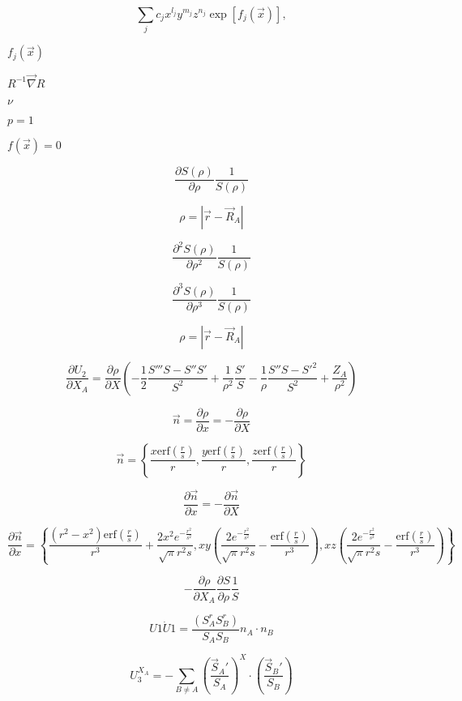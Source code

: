 \documentclass{article}
\begin{document}
\[
\sum_j c_j x^{l_j} y^{m_j} z^{n_j} \exp[f_j(\vec{x})],
\]
\pagebreak

$f_j(\vec{x})$
\pagebreak

$R^{-1} \vec\nabla R$
\pagebreak

$\nu$
\pagebreak

$p=1$
\pagebreak

$f(\vec{x})=0$
\pagebreak

\[
    \frac{\partial S(\rho)}{\partial \rho} \frac{1}{S(\rho)}
\]
\pagebreak

\[
   \rho = |\vec r - \vec R_A |
\]
\pagebreak

\[
    \frac{\partial^2 S(\rho)}{\partial \rho^2} \frac{1}{S(\rho)}
\]
\pagebreak

\[
    \frac{\partial^3 S(\rho)}{\partial \rho^3} \frac{1}{S(\rho)}
\]
\pagebreak

\[
  \rho = \left| \vec r- \vec R_A \right|
\]
\pagebreak

\[
\frac{\partial U_2}{\partial X_A} = \frac{\partial \rho}{\partial X}
          \left(-\frac{1}{2}\frac{S''' S - S'' S'}{S^2} + \frac{1}{\rho^2}\frac{S'}{S}
          - \frac{1}{\rho} \frac{S''S - S'^2}{S^2} + \frac{Z_A}{\rho^2}\right)
\]
\pagebreak

\[
    \vec n  = \frac{\partial \rho}{\partial x} = -\frac{\partial \rho}{\partial X}
\]
\pagebreak

\[
\vec n = \left\{\frac{x \mathrm{erf}\left(\frac{r}{s}\right)}{r},
         \frac{y \mathrm{erf}\left(\frac{r}{s}\right)}{r},
         \frac{z \mathrm{erf}\left(\frac{r}{s}\right)}{r}\right\}
\]
\pagebreak

\[
    \frac{\partial \vec n}{\partial x}  = -\frac{\partial \vec n}{\partial X}
\]
\pagebreak

\[
\frac{\partial\vec n}{\partial x} =
\left\{\frac{\left(r^2-x^2\right) \mathrm{erf}\left(\frac{r}{s}\right)}{r^3}
   +\frac{2 x^2 e^{-\frac{r^2}{s^2}}}{\sqrt{\pi } r^2 s},
 x y \left(\frac{2 e^{-\frac{r^2}{s^2}}}{\sqrt{\pi } r^2 s}
   -\frac{\mathrm{erf}\left(\frac{r}{s}\right)}{r^3}\right),
 x z \left(\frac{2 e^{-\frac{r^2}{s^2}}}{\sqrt{\pi } r^2 s}
   -\frac{\mathrm{erf}\left(\frac{r}{s}\right)}{r^3}\right)\right\}
\]
\pagebreak

\[
 -\frac{\partial \rho}{\partial X_A}\frac{\partial S}{\partial \rho}\frac{1}{S}
\]
\pagebreak

\[
 U1\dot U1 = \frac{\left(S^r_A S^r_B\right)}{S_A S_B} n_A \cdot n_B
\]
\pagebreak

\[
U_3^{X_A} = -\sum_{B\neq A}\left(\frac{\vec S_A'}{S_A}\right)^X\cdot\left(\frac{\vec S_B'}{S_B}\right)
\]
\pagebreak
\end{document}
